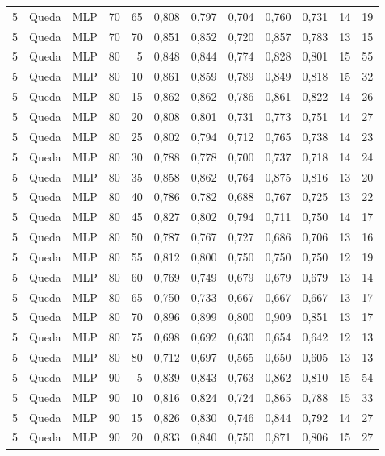 \begin{longtable}{ccclrrrrrrrr}
5 & Queda & MLP & 70 & 65 & 0,808 & 0,797 & 0,704 & 0,760 & 0,731 & 14 & 19 \\
5 & Queda & MLP & 70 & 70 & 0,851 & 0,852 & 0,720 & 0,857 & 0,783 & 13 & 15 \\
5 & Queda & MLP & 80 & 5 & 0,848 & 0,844 & 0,774 & 0,828 & 0,801 & 15 & 55 \\
5 & Queda & MLP & 80 & 10 & 0,861 & 0,859 & 0,789 & 0,849 & 0,818 & 15 & 32 \\
5 & Queda & MLP & 80 & 15 & 0,862 & 0,862 & 0,786 & 0,861 & 0,822 & 14 & 26 \\
5 & Queda & MLP & 80 & 20 & 0,808 & 0,801 & 0,731 & 0,773 & 0,751 & 14 & 27 \\
5 & Queda & MLP & 80 & 25 & 0,802 & 0,794 & 0,712 & 0,765 & 0,738 & 14 & 23 \\
5 & Queda & MLP & 80 & 30 & 0,788 & 0,778 & 0,700 & 0,737 & 0,718 & 14 & 24 \\
5 & Queda & MLP & 80 & 35 & 0,858 & 0,862 & 0,764 & 0,875 & 0,816 & 13 & 20 \\
5 & Queda & MLP & 80 & 40 & 0,786 & 0,782 & 0,688 & 0,767 & 0,725 & 13 & 22 \\
5 & Queda & MLP & 80 & 45 & 0,827 & 0,802 & 0,794 & 0,711 & 0,750 & 14 & 17 \\
5 & Queda & MLP & 80 & 50 & 0,787 & 0,767 & 0,727 & 0,686 & 0,706 & 13 & 16 \\
5 & Queda & MLP & 80 & 55 & 0,812 & 0,800 & 0,750 & 0,750 & 0,750 & 12 & 19 \\
5 & Queda & MLP & 80 & 60 & 0,769 & 0,749 & 0,679 & 0,679 & 0,679 & 13 & 14 \\
5 & Queda & MLP & 80 & 65 & 0,750 & 0,733 & 0,667 & 0,667 & 0,667 & 13 & 17 \\
5 & Queda & MLP & 80 & 70 & 0,896 & 0,899 & 0,800 & 0,909 & 0,851 & 13 & 17 \\
5 & Queda & MLP & 80 & 75 & 0,698 & 0,692 & 0,630 & 0,654 & 0,642 & 12 & 13 \\
5 & Queda & MLP & 80 & 80 & 0,712 & 0,697 & 0,565 & 0,650 & 0,605 & 13 & 13 \\
5 & Queda & MLP & 90 & 5 & 0,839 & 0,843 & 0,763 & 0,862 & 0,810 & 15 & 54 \\
5 & Queda & MLP & 90 & 10 & 0,816 & 0,824 & 0,724 & 0,865 & 0,788 & 15 & 33 \\
5 & Queda & MLP & 90 & 15 & 0,826 & 0,830 & 0,746 & 0,844 & 0,792 & 14 & 27 \\
5 & Queda & MLP & 90 & 20 & 0,833 & 0,840 & 0,750 & 0,871 & 0,806 & 15 & 27 \\

\end{longtable}
